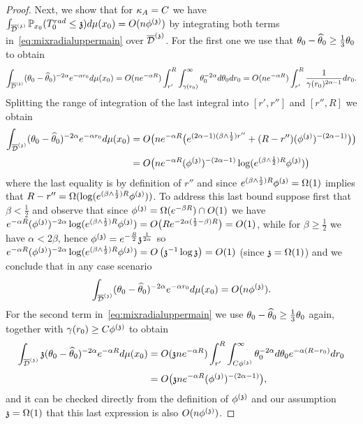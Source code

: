 \begin{proof}
Next, we show that for $\KA=C$ we have $\int_{\ndt}\PP_{x_0}(\trad\leq \ss)d\mu(x_0)=O(n\phis)$ by integrating both terms in~\eqref{eq:mixradialuppermain} over $\ndt$.
For the first one we use that $\theta_0-\hatt\geq\frac{1}{3}\theta_0$ to obtain 
\[
\int_{\ndt}(\theta_0-\hatt)^{-2\alpha}e^{-\alpha r_0}d\mu(x_0)= O(ne^{-\alpha R})\int_{r'}^R\int_{\gamma(r_0)}^{\infty}\theta_0^{-2\alpha}d\theta_0dr_0 =O(ne^{-\alpha R})\int_{r'}^{R}\frac{1}{\gamma(r_0)^{2\alpha-1}}dr_0.
\]
Splitting the range of integration of the last integral into $[r',r'']$ and $[r'',R]$ we obtain
\begin{align*}
\int_{\ndt}(\theta_0-\hatt)^{-2\alpha}e^{-\alpha r_0}d\mu(x_0)
& = O\big(ne^{-\alpha R}\big(e^{(2\alpha-1)(\beta\wedge\frac{1}{2})r''}+(R-r'')(\phis)^{-(2\alpha-1)}\big)\big) \\[2pt]
& = O\big(ne^{-\alpha R}(\phis)^{-(2\alpha-1)}\log(e^{(\beta\wedge\frac12)R}\phis)\big)
\end{align*}
where the last equality is by definition of $r''$ and since $e^{(\beta\wedge\frac{1}{2})R}\phis=\Omega(1)$ implies that $R-r''=\Omega(\log(e^{(\beta\wedge\frac{1}{2})R}\phis))$. To address this last bound suppose first that $\beta<\frac{1}{2}$ and observe that since $\phis=\Omega(e^{-\beta R})\cap O(1)$ we have
$e^{-\alpha R}(\phis)^{-2\alpha}\log(e^{(\beta\wedge\frac12)R}\phis)=O\big(Re^{-2\alpha(\frac{1}{2}-\beta)R}\big)=O(1)$,
while for $\beta\geq\frac{1}{2}$ we have $\alpha<2\beta$, hence $\phis=e^{-\frac{R}{2}}\ss^{\frac{1}{2\alpha}}$ so $e^{-\alpha R}(\phis)^{-2\alpha}\log(e^{(\beta\wedge\frac12)R}\phis)=O\left(\ss^{-1}\log\ss\right)=O(1)$ (since $\ss=\Omega(1)$) and we conclude that in any case scenario
\[\int_{\ndt}(\theta_0-\hatt)^{-2\alpha}e^{-\alpha r_0}d\mu(x_0)=O(n\phis).\]
For the second term in~\eqref{eq:mixradialuppermain} we use $\theta_0-\hatt\geq\frac{1}{3}\theta_0$ again, together with $\gamma(r_0)\geq C\phis$ to obtain 
\begin{align*}
\int_{\ndt}\ss (\theta_0-\hatt)^{-2\alpha}e^{-\alpha R}d\mu(x_0)&= O(\ss ne^{-\alpha R})\int_{r'}^R\int_{C\phis}^{\infty}\theta_0^{-2\alpha}d\theta_0e^{-\alpha(R-r_0)}dr_0
\\[2pt]&= O\big(\ss ne^{-\alpha R}(\phis)^{-(2\alpha-1)}\big),
\end{align*}
and it can be checked directly from the definition of $\phis$ and our assumption $\ss=\Omega(1)$ that this last expression is also $O(n\phis)$.
\end{proof}

\medskip

